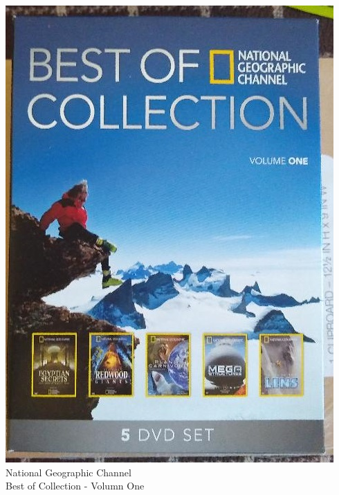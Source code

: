\documentclass[t]{beamer}
\newcommand{\htarget}[2]{\hypertarget{#1}{#2}}
\begin{document}
\begin{frame}\htarget{geography}{} \begin{center}
\includegraphics[height=0.8\textheight]{dvd01_mini.jpg} \\
National Geographic Channel \\
Best of Collection - Volumn One
\end{center} \end{frame}
\end{document}
